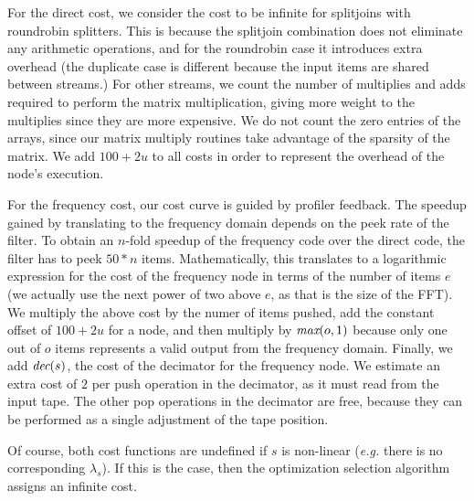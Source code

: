 For the direct cost, we consider the cost to be infinite for
splitjoins with roundrobin splitters.  This is because the splitjoin
combination does not eliminate any arithmetic operations, and for the
roundrobin case it introduces extra overhead (the duplicate case is
different because the input items are shared between streams.)  For
other streams, we count the number of multiplies and adds required to
perform the matrix multiplication, giving more weight to the
multiplies since they are more expensive.  We do not count the zero
entries of the arrays, since our matrix multiply routines take
advantage of the sparsity of the matrix.  We add $100+2u$ to all costs
in order to represent the overhead of the node's execution.

For the frequency cost, our cost curve is guided by profiler feedback.
The speedup gained by translating to the frequency domain depends on
the peek rate of the filter.  To obtain an $n$-fold speedup of the
frequency code over the direct code, the filter has to peek $50*n$
items.  Mathematically, this translates to a logarithmic expression
for the cost of the frequency node in terms of the number of items $e$
(we actually use the next power of two above $e$, as that is the size
of the FFT).  We multiply the above cost by the numer of items pushed,
add the constant offset of $100+2u$ for a node, and then multiply by
$\mbox{\it max}(o, 1)$ because only one out of $o$ items represents a valid
output from the frequency domain.  Finally, we add $\mbox{\it dec}(s)$, the
cost of the decimator for the frequency node.  We estimate an extra
cost of $2$ per push operation in the decimator, as it must read from
the input tape.  The other pop operations in the decimator are free,
because they can be performed as a single adjustment of the tape
position.

Of course, both cost functions are undefined if $s$ is non-linear
({\it e.g.} there is no corresponding $\lambda_s$). If this is the
case, then the optimization selection algorithm assigns an infinite
cost.


